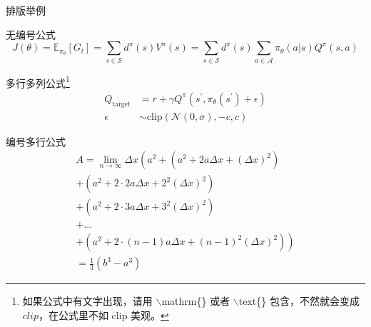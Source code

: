 \documentclass{beamer}
\begin{document}
	\begin{frame}{排版举例}
		\begin{exampleblock}{无编号公式} %
			\begin{equation*}
				J(\theta) = \mathbb{E}_{\pi_\theta}[G_t] = \sum_{s\in\mathcal{S}} d^\pi (s)V^\pi(s)=\sum_{s\in\mathcal{S}} d^\pi(s)\sum_{a\in\mathcal{A}}\pi_\theta(a|s)Q^\pi(s,a)
			\end{equation*}
		\end{exampleblock}
		\begin{exampleblock}{多行多列公式\footnote{如果公式中有文字出现，请用 $\backslash$mathrm\{\} 或者 $\backslash$text\{\} 包含，不然就会变成 $clip$，在公式里不如 $\mathrm{clip}$ 美观。}}
			\begin{align}
				Q_\mathrm{target}&=r+\gamma Q^\pi(s^\prime, \pi_\theta(s^\prime)+\epsilon)\\
				\epsilon&\sim\mathrm{clip}(\mathcal{N}(0, \sigma), -c, c)\nonumber
			\end{align}
		\end{exampleblock}
	\end{frame}

	\begin{frame}
		\begin{exampleblock}{编号多行公式}
			\begin{multline}
				A=\lim_{n\rightarrow\infty}\Delta x\left(a^{2}+\left(a^{2}+2a\Delta x+\left(\Delta x\right)^{2}\right)\right.\label{eq:reset}\\
				+\left(a^{2}+2\cdot2a\Delta x+2^{2}\left(\Delta x\right)^{2}\right)\\
				+\left(a^{2}+2\cdot3a\Delta x+3^{2}\left(\Delta x\right)^{2}\right)\\
				+\ldots\\
				\left.+\left(a^{2}+2\cdot(n-1)a\Delta x+(n-1)^{2}\left(\Delta x\right)^{2}\right)\right)\\
				=\frac{1}{3}\left(b^{3}-a^{3}\right)
			\end{multline}
		\end{exampleblock}
	\end{frame}
\end{document}
